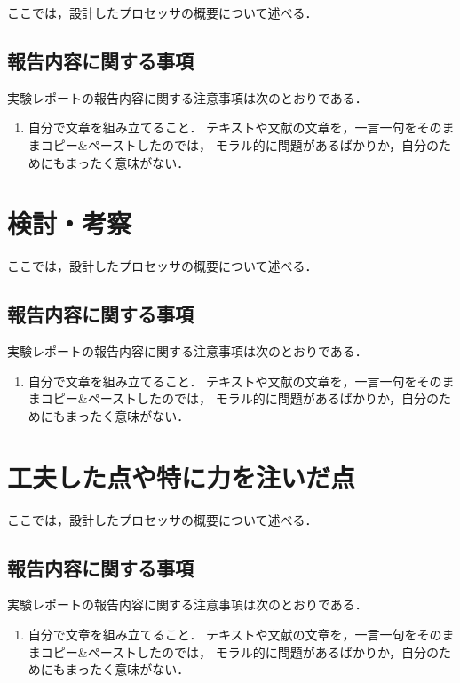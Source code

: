 \documentclass{jarticle}[11pt]
\begin{document}
ここでは，設計したプロセッサの概要について述べる．

\subsection{報告内容に関する事項}
実験レポートの報告内容に関する注意事項は次のとおりである．
\begin{enumerate}
\item 自分で文章を組み立てること．
テキストや文献の文章を，一言一句をそのままコピー\&ペーストしたのでは，
モラル的に問題があるばかりか，自分のためにもまったく意味がない．
\end{enumerate}





\section{検討・考察}
\label{sec:検討・考察}

ここでは，設計したプロセッサの概要について述べる．

\subsection{報告内容に関する事項}
実験レポートの報告内容に関する注意事項は次のとおりである．
\begin{enumerate}
\item 自分で文章を組み立てること．
テキストや文献の文章を，一言一句をそのままコピー\&ペーストしたのでは，
モラル的に問題があるばかりか，自分のためにもまったく意味がない．
\end{enumerate}





\section{工夫した点や特に力を注いだ点}
\label{sec:工夫した点や特に力を注いだ点}

ここでは，設計したプロセッサの概要について述べる．

\subsection{報告内容に関する事項}
実験レポートの報告内容に関する注意事項は次のとおりである．
\begin{enumerate}
\item 自分で文章を組み立てること．
テキストや文献の文章を，一言一句をそのままコピー\&ペーストしたのでは，
モラル的に問題があるばかりか，自分のためにもまったく意味がない．
\end{enumerate}
\end{document}
